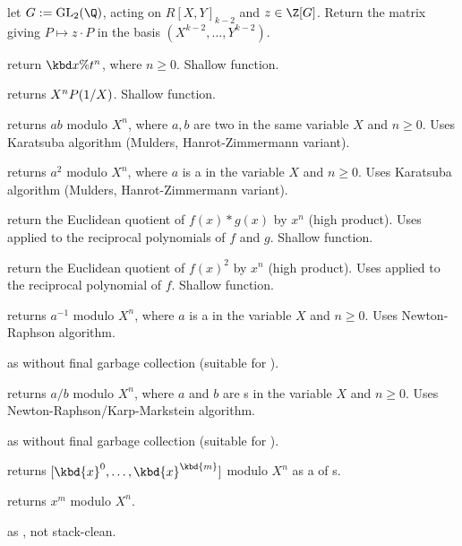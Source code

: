  let $G:=\text{GL}_2(\Q)$, acting
on $R[X,Y]_{k-2}$ and $z\in \Z[G]$. Return the matrix giving
$P\mapsto z\cdot P$ in the basis $(X^{k-2},\dots,Y^{k-2})$.


 return $\kbd{x \% } t^n$,
where $n\geq 0$. Shallow function.

 returns $X^n\*P(1/X)$. Shallow function.

 returns $a b$ modulo $X^n$,
where $a,b$ are two  in the same variable $X$ and $n \geq 0$. Uses
Karatsuba algorithm (Mulders, Hanrot-Zimmermann variant).

 returns $a^2$ modulo $X^n$,
where $a$ is a  in the variable $X$ and $n \geq 0$. Uses
Karatsuba algorithm (Mulders, Hanrot-Zimmermann variant).

 return the Euclidean quotient
of $f(x)*g(x)$ by $x^n$ (high product). Uses  applied to
the reciprocal polynomials of $f$ and $g$. Shallow function.

 return the Euclidean quotient
of $f(x)^2$ by $x^n$ (high product). Uses  applied to
the reciprocal polynomial of $f$. Shallow function.

 returns $a^{-1}$ modulo $X^n$,
where $a$ is a  in the variable $X$ and $n \geq 0$. Uses
Newton-Raphson algorithm.

 as  without final garbage
collection (suitable for ).

 returns $a/b$ modulo $X^n$,
where $a$ and $b$ are s in the variable $X$ and $n \geq 0$. Uses
Newton-Raphson/Karp-Markstein algorithm.

 as  without final garbage
collection (suitable for ).

 returns $[\kbd{x}^0,
\dots, \kbd{x}^\kbd{m}]$ modulo $X^n$ as a  of s.

 returns $x^m$ modulo
$X^n$.

 as ,
not stack-clean.

